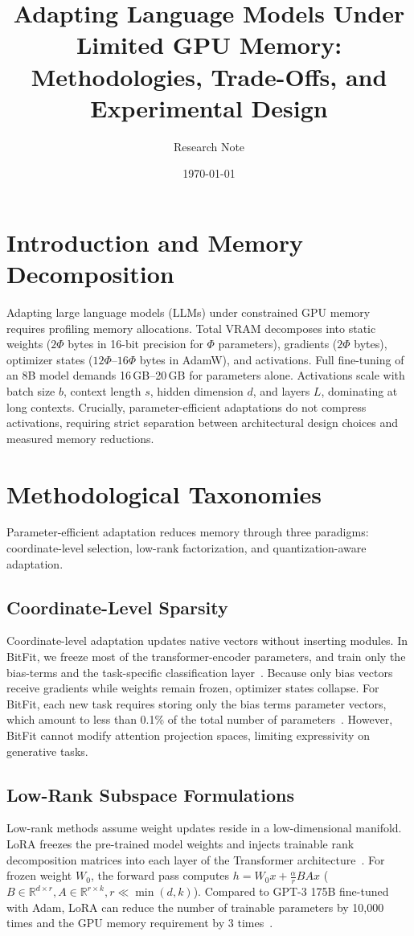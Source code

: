 \documentclass[11pt,a4paper]{article}
\title{\textbf{Adapting Language Models Under Limited GPU Memory:\\Methodologies, Trade-Offs, and Experimental Design}}
\author{Research Note}
\date{\today}
\begin{document}
\maketitle

\section{Introduction and Memory Decomposition}
Adapting large language models (LLMs) under constrained GPU memory requires profiling memory allocations. Total VRAM decomposes into static weights ($2\Phi$ bytes in 16-bit precision for $\Phi$ parameters), gradients ($2\Phi$ bytes), optimizer states ($12\Phi$--$16\Phi$ bytes in AdamW), and activations. Full fine-tuning of an 8B model demands 16\,GB--20\,GB for parameters alone. Activations scale with batch size $b$, context length $s$, hidden dimension $d$, and layers $L$, dominating at long contexts. Crucially, parameter-efficient adaptations do not compress activations, requiring strict separation between architectural design choices and measured memory reductions.

\section{Methodological Taxonomies}
Parameter-efficient adaptation reduces memory through three paradigms: coordinate-level selection, low-rank factorization, and quantization-aware adaptation.

\subsection{Coordinate-Level Sparsity}
Coordinate-level adaptation updates native vectors without inserting modules. In BitFit, we freeze most of the transformer-encoder parameters, and train only the bias-terms and the task-specific classification layer~\cite{benzaken2021bitfit}. Because only bias vectors receive gradients while weights remain frozen, optimizer states collapse. For BitFit, each new task requires storing only the bias terms parameter vectors, which amount to less than 0.1\% of the total number of parameters~\cite{benzaken2021bitfit}. However, BitFit cannot modify attention projection spaces, limiting expressivity on generative tasks.

\subsection{Low-Rank Subspace Formulations}
Low-rank methods assume weight updates reside in a low-dimensional manifold. LoRA freezes the pre-trained model weights and injects trainable rank decomposition matrices into each layer of the Transformer architecture~\cite{hu2021lora}. For frozen weight $W_0$, the forward pass computes $h = W_0 x + \frac{\alpha}{r} B A x$ ($B \in \mathbb{R}^{d \times r}, A \in \mathbb{R}^{r \times k}, r \ll \min(d, k)$). Compared to GPT-3 175B fine-tuned with Adam, LoRA can reduce the number of trainable parameters by 10,000 times and the GPU memory requirement by 3 times~\cite{hu2021lora}.
\end{document}
